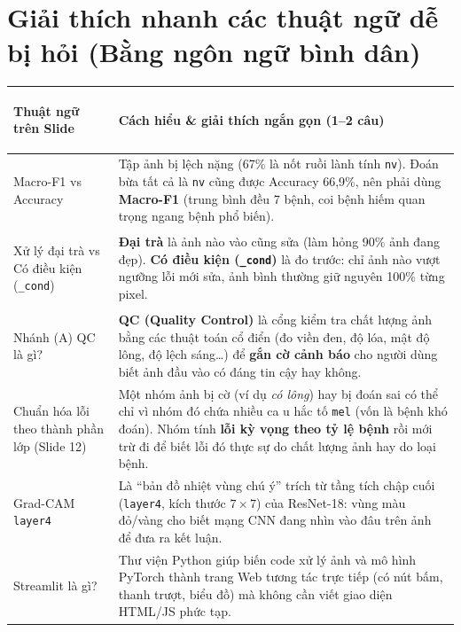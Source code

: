 \documentclass[11pt,a4paper]{article}
\begin{document}
\section{Giải thích nhanh các thuật ngữ dễ bị hỏi (Bằng ngôn ngữ bình dân)}

\noindent\begin{tabularx}{\textwidth}{>{\bfseries\raggedright\arraybackslash}p{3.8cm} X}
\toprule
Thuật ngữ trên Slide & Cách hiểu \& giải thích ngắn gọn (1--2 câu) \\
\midrule
Macro-F1 vs Accuracy & Tập ảnh bị lệch nặng (67\% là nốt ruồi lành tính \texttt{nv}). Đoán bừa tất cả là \texttt{nv} cũng được Accuracy 66,9\%, nên phải dùng \textbf{Macro-F1} (trung bình đều 7 bệnh, coi bệnh hiếm quan trọng ngang bệnh phổ biến). \\
\addlinespace[3pt]
Xử lý đại trà vs Có điều kiện (\texttt{\_cond}) & \textbf{Đại trà} là ảnh nào vào cũng sửa (làm hỏng 90\% ảnh đang đẹp). \textbf{Có điều kiện (\texttt{\_cond})} là đo trước: chỉ ảnh nào vượt ngưỡng lỗi mới sửa, ảnh bình thường giữ nguyên 100\% từng pixel. \\
\addlinespace[3pt]
Nhánh (A) QC là gì? & \textbf{QC (Quality Control)} là cổng kiểm tra chất lượng ảnh bằng các thuật toán cổ điển (đo viền đen, độ lóa, mật độ lông, độ lệch sáng\dots) để \textbf{gắn cờ cảnh báo} cho người dùng biết ảnh đầu vào có đáng tin cậy hay không. \\
\addlinespace[3pt]
Chuẩn hóa lỗi theo thành phần lớp (Slide 12) & Một nhóm ảnh bị cờ (ví dụ \emph{có lông}) hay bị đoán sai có thể chỉ vì nhóm đó chứa nhiều ca u hắc tố \texttt{mel} (vốn là bệnh khó đoán). Nhóm tính \textbf{lỗi kỳ vọng theo tỷ lệ bệnh} rồi mới trừ đi để biết lỗi đó thực sự do chất lượng ảnh hay do loại bệnh. \\
\addlinespace[3pt]
Grad-CAM \texttt{layer4} & Là ``bản đồ nhiệt vùng chú ý'' trích từ tầng tích chập cuối (\texttt{layer4}, kích thước $7\times 7$) của ResNet-18: vùng màu đỏ/vàng cho biết mạng CNN đang nhìn vào đâu trên ảnh để đưa ra kết luận. \\
\addlinespace[3pt]
Streamlit là gì? & Thư viện Python giúp biến code xử lý ảnh và mô hình PyTorch thành trang Web tương tác trực tiếp (có nút bấm, thanh trượt, biểu đồ) mà không cần viết giao diện HTML/JS phức tạp. \\
\bottomrule
\end{tabularx}

\end{document}
